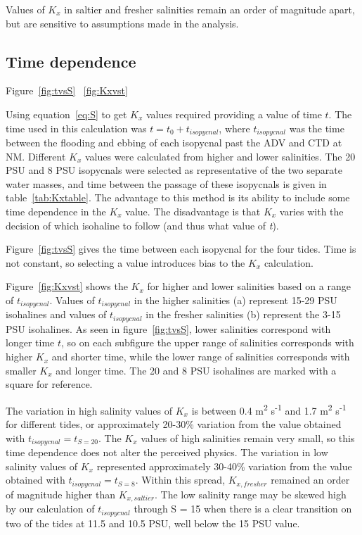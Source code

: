 Values of $K_x$ in saltier and fresher salinities remain an order of magnitude apart, but are sensitive to assumptions made in the analysis.

\subsection{Time dependence}

Figure~\ref{fig:tvsS} ~\ref{fig:Kxvst}

Using equation~\ref{eq:S} to get $K_x$ values required providing a value of time $t$. The time used in this calculation was $t=t_0 + t_{isopycnal}$, where $t_{isopycnal}$ was the time between the flooding and ebbing of each isopycnal past the ADV and CTD at NM. Different $K_x$ values were calculated from higher and lower salinities. The 20 PSU and 8 PSU isopycnals were selected as representative of the two separate water masses, and time between the passage of these isopycnals is given in table~\ref{tab:Kxtable}. The advantage to this method is its ability to include some time dependence in the $K_x$ value. The disadvantage is that $K_x$ varies with the decision of which isohaline to follow (and thus what value of \emph{t}). 

Figure~\ref{fig:tvsS} gives the time between each isopycnal for the four tides. Time is not constant, so selecting a value introduces bias to the $K_x$ calculation.

Figure~\ref{fig:Kxvst} shows the $K_x$ for higher and lower salinities based on a range of $t_{isopycnal}$. Values of $t_{isopycnal}$ in the higher salinities (a) represent 15-29 PSU isohalines and values of $t_{isopycnal}$ in the fresher salinities (b) represent the 3-15 PSU isohalines. As seen in figure~\ref{fig:tvsS}, lower salinities correspond with longer time $t$, so on each subfigure the upper range of salinities corresponds with higher $K_x$ and shorter time, while the lower range of salinities corresponds with smaller $K_x$ and longer time. The 20 and 8 PSU isohalines are marked with a square for reference.

The variation in high salinity values of $K_x$ is between 0.4 m\textsuperscript{2} s\textsuperscript{-1} and 1.7 m\textsuperscript{2} s\textsuperscript{-1} for different tides, or approximately 20-30\% variation from the value obtained with $t_{isopycnal}=t_{S=20}$. The $K_x$ values of high salinities remain very small, so this time dependence does not alter the perceived physics. The variation in low salinity values of $K_x$ represented approximately 30-40\% variation from the value obtained with $t_{isopycnal}=t_{S=8}$. Within this spread, $K_{x,fresher}$ remained an order of magnitude higher than $K_{x,saltier}$. The low salinity range may be skewed high by our calculation of $t_{isopycnal}$ through S = 15 when there is a clear transition on two of the tides at 11.5 and 10.5 PSU, well below the 15 PSU value. 


